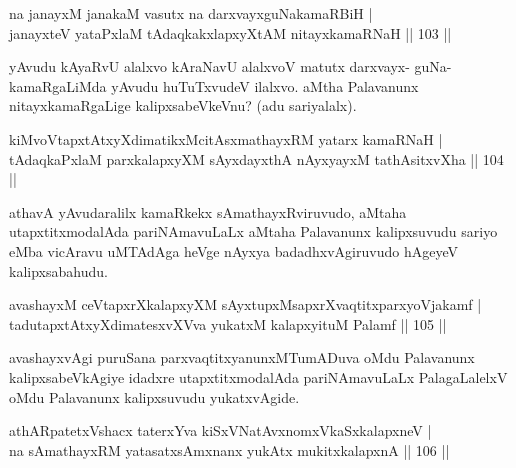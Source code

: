 \begin{shl}
na janayxM janakaM vasutx na darxvayxguNakamaRBiH |\\
janayxteV yataPxlaM tAdaqkakxlapxyXtAM nitayxkamaRNaH \hfill || 103 ||
\end{shl}

\begin{artha}
yAvudu kAyaRvU alalxvo kAraNavU alalxvoV matutx darxvayx- guNa-kamaRgaLiMda yAvudu huTuTxvudeV ilalxvo. aMtha Palavanunx nitayxkamaRgaLige kalipxsabeVkeVnu? (adu sariyalalx).
\end{artha}

\begin{shl}
kiMvoVtapxtAtxyXdimatikxMcitAsxmathayxRM yatarx kamaRNaH |\\
tAdaqkaPxlaM parxkalapxyXM sAyxdayxthA nAyxyayxM tathA\s sitxvXha \hfill || 104 ||
\end{shl}

\begin{artha}
athavA yAvudaralilx kamaRkekx sAmathayxRviruvudo, aMtaha utapxtitxmodalAda pariNAmavuLaLx aMtaha Palavanunx kalipxsuvudu sariyo eMba vicAravu uMTAdAga heVge nAyxya badadhxvAgiruvudo hAgeyeV kalipxsabahudu. 
\end{artha}


\begin{shl}
avashayxM ceVtapxrXkalapxyXM sAyxtupxMsapxrXvaqtitxparxyoVjakamf |\\
tadutapxtAtxyXdimatesxvXVva yukatxM kalapxyituM Palamf \hfill || 105 ||
\end{shl}

\begin{artha}
avashayxvAgi puruSana parxvaqtitxyanunxMTumADuva oMdu Palavanunx kalipxsabeVkAgiye idadxre utapxtitxmodalAda pariNAmavuLaLx PalagaLalelxV oMdu Palavanunx kalipxsuvudu yukatxvAgide.
\end{artha}


\begin{shl}
athARpatetxVshacx taterxYva kiSxVNatAvxnomxVkaSxkalapxneV |\\
na sAmathayxRM yatasatxsAmxnanx yukAtx mukitxkalapxnA \hfill || 106 ||
\end{shl}


